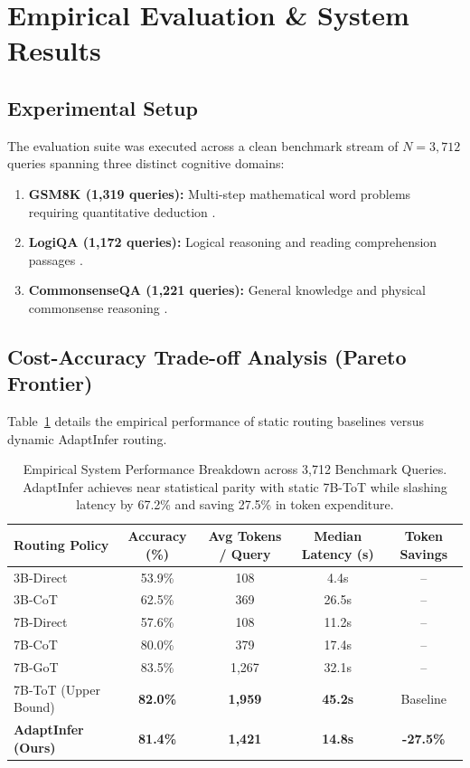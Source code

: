 \documentclass[pdflatex,sn-mathphys-num]{sn-jnl}%
\theoremstyle{thmstyleone}%
\theoremstyle{thmstyletwo}%
\theoremstyle{thmstylethree}%
\begin{document}
\section{Empirical Evaluation \& System Results}\label{sec4}

\subsection{Experimental Setup}
The evaluation suite was executed across a clean benchmark stream of $N=3,712$ queries spanning three distinct cognitive domains:
\begin{enumerate}
    \item \textbf{GSM8K (1,319 queries):} Multi-step mathematical word problems requiring quantitative deduction \cite{cobbe2021training}.
    \item \textbf{LogiQA (1,172 queries):} Logical reasoning and reading comprehension passages \cite{liu2020logiqa}.
    \item \textbf{CommonsenseQA (1,221 queries):} General knowledge and physical commonsense reasoning \cite{talmor2019commonsenseqa}.
\end{enumerate}

\subsection{Cost-Accuracy Trade-off Analysis (Pareto Frontier)}
Table~\ref{tab:system_results} details the empirical performance of static routing baselines versus dynamic AdaptInfer routing.

\begin{table}[htbp]
\centering
\caption{Empirical System Performance Breakdown across 3,712 Benchmark Queries. AdaptInfer achieves near statistical parity with static 7B-ToT while slashing latency by 67.2\% and saving 27.5\% in token expenditure.}
\label{tab:system_results}
\begin{tabular}{lcccc}
\toprule
\textbf{Routing Policy} & \textbf{Accuracy (\%)} & \textbf{Avg Tokens / Query} & \textbf{Median Latency (s)} & \textbf{Token Savings} \\
\midrule
3B-Direct & 53.9\% & 108 & 4.4s & -- \\
3B-CoT & 62.5\% & 369 & 26.5s & -- \\
7B-Direct & 57.6\% & 108 & 11.2s & -- \\
7B-CoT & 80.0\% & 379 & 17.4s & -- \\
7B-GoT & 83.5\% & 1,267 & 32.1s & -- \\
7B-ToT (Upper Bound) & \textbf{82.0\%} & \textbf{1,959} & \textbf{45.2s} & Baseline \\
\midrule
\textbf{AdaptInfer (Ours)} & \textbf{81.4\%} & \textbf{1,421} & \textbf{14.8s} & \textbf{-27.5\%} \\
\bottomrule
\end{tabular}
\end{table}
\end{document}
